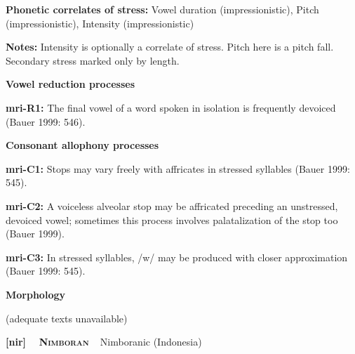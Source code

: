 \begin{styleBody}
\textbf{Phonetic correlates of stress: }Vowel duration (impressionistic), Pitch (impressionistic), Intensity (impressionistic)
\end{styleBody}

\begin{styleBody}
\textbf{Notes: }Intensity is optionally a correlate of stress. Pitch here is a pitch fall. Secondary stress marked only by length.
\end{styleBody}

\begin{styleBody}
\textbf{Vowel reduction processes}
\end{styleBody}

\begin{styleBody}
\textbf{mri-R1:} The final vowel of a word spoken in isolation is frequently devoiced (Bauer 1999: 546).
\end{styleBody}

\begin{styleBody}
\textbf{Consonant allophony processes}
\end{styleBody}

\begin{styleBody}
\textbf{mri-C1: }Stops may vary freely with affricates in stressed syllables (Bauer 1999: 545).
\end{styleBody}

\begin{styleBody}
\textbf{mri-C2: }A voiceless alveolar stop may be affricated preceding an unstressed, devoiced vowel; sometimes this process involves palatalization of the stop too (Bauer 1999).
\end{styleBody}

\begin{styleBody}
\textbf{mri-C3: }In stressed syllables, /w/ may be produced with closer approximation (Bauer 1999: 545).
\end{styleBody}

\begin{styleBody}
\textbf{Morphology}
\end{styleBody}

\begin{styleBody}
(adequate texts unavailable)
\end{styleBody}

\clearpage\begin{styleBody}
\textbf{[nir] }\ \ \textbf{\textsc{Nimboran}}\textbf{\ \ }Nimboranic (Indonesia)
\end{styleBody}

